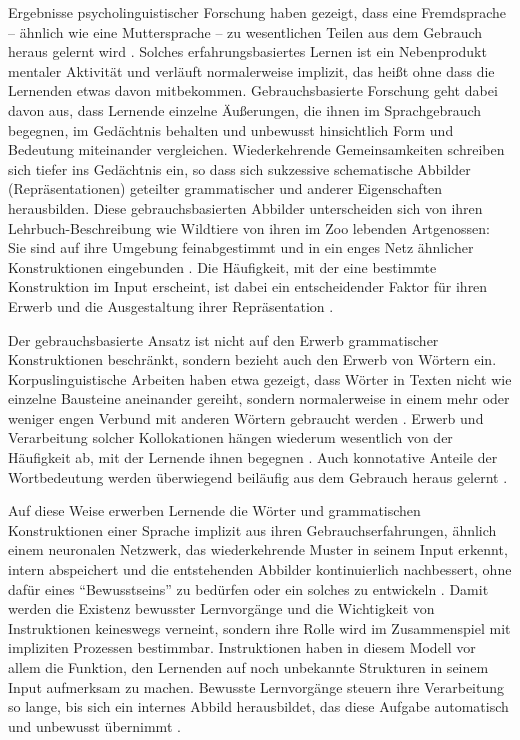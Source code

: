 \documentclass[11pt]{article}\usepackage[]{graphicx}\usepackage[]{color}
\begin{document}
Ergebnisse psycholinguistischer Forschung haben gezeigt, dass eine Fremdsprache -- ähnlich wie eine Muttersprache -- zu wesentlichen Teilen aus dem Gebrauch heraus gelernt wird \parencites{Ellis.2015,Madlener.2015}. Solches erfahrungsbasiertes Lernen ist ein Nebenprodukt mentaler Aktivität und verläuft normalerweise implizit, das heißt ohne dass die Lernenden etwas davon mitbekommen. Gebrauchsbasierte Forschung geht dabei davon aus, dass Lernende einzelne Äußerungen, die ihnen im Sprachgebrauch begegnen, im Gedächtnis behalten und unbewusst hinsichtlich Form und Bedeutung miteinander vergleichen. Wiederkehrende Gemeinsamkeiten schreiben sich tiefer ins Gedächtnis ein, so dass sich sukzessive schematische Abbilder (Repräsentationen) geteilter grammatischer und anderer Eigenschaften herausbilden. Diese gebrauchsbasierten Abbilder unterscheiden sich von ihren Lehrbuch-Beschreibung wie Wildtiere von ihren im Zoo lebenden Artgenossen: Sie sind auf ihre Umgebung feinabgestimmt und in ein enges Netz ähnlicher Konstruktionen eingebunden \parencites{Diessel.2019,Roemer.2004,Wagner.2015}. Die Häufigkeit, mit der eine bestimmte Konstruktion im Input erscheint, ist dabei ein entscheidender Faktor für ihren Erwerb und die Ausgestaltung ihrer Repräsentation \parencites{Diessel.2016,Schmid.2018}. 

Der gebrauchsbasierte Ansatz ist nicht auf den Erwerb grammatischer Konstruktionen beschränkt, sondern bezieht auch den Erwerb von Wörtern ein. Korpuslinguistische Arbeiten haben etwa gezeigt, dass Wörter in Texten nicht wie einzelne Bausteine aneinander gereiht, sondern normalerweise in einem mehr oder weniger engen Verbund mit anderen Wörtern gebraucht werden \parencites{Hoey.2004,Sinclair.1991}. Erwerb und Verarbeitung solcher Kollokationen hängen wiederum wesentlich von der Häufigkeit ab, mit der Lernende ihnen begegnen \parencite{Schmitt.2012}. Auch konnotative Anteile der Wortbedeutung werden überwiegend beiläufig aus dem Gebrauch heraus gelernt \parencite{Corrigan.2004}. 

Auf diese Weise erwerben Lernende die Wörter und grammatischen Konstruktionen einer Sprache implizit aus ihren Gebrauchserfahrungen, ähnlich einem neuronalen Netzwerk, das wiederkehrende Muster in seinem Input erkennt, intern abspeichert und die entstehenden Abbilder kontinuierlich nachbessert, ohne dafür eines ``Bewusstseins'' zu bedürfen oder ein solches zu entwickeln \parencite{Elman.1993}. Damit werden die Existenz bewusster Lernvorgänge und die Wichtigkeit von Instruktionen keineswegs verneint, sondern ihre Rolle wird im Zusammenspiel mit impliziten Prozessen bestimmbar. Instruktionen haben in diesem Modell vor allem die Funktion, den Lernenden auf noch unbekannte Strukturen in seinem Input aufmerksam zu machen. Bewusste Lernvorgänge steuern ihre Verarbeitung so lange, bis sich ein internes Abbild herausbildet, das diese Aufgabe automatisch und unbewusst übernimmt \parencites{Ellis.2015b,Roehr-Brackin.2018}.
\end{document}
